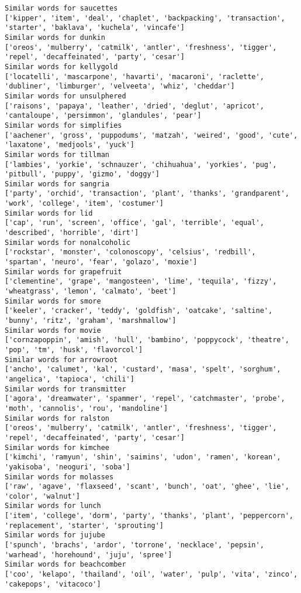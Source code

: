 \documentclass[11pt]{article}
\begin{document}
\begin{Verbatim}[commandchars=\\\{\}]
Similar words for saucettes
['kipper', 'item', 'deal', 'chaplet', 'backpacking', 'transaction', 'starter', 'baklava', 'kuchela', 'vincafe']
Similar words for dunkin
['oreos', 'mulberry', 'catmilk', 'antler', 'freshness', 'tigger', 'repel', 'decaffeinated', 'party', 'cesar']
Similar words for kellygold
['locatelli', 'mascarpone', 'havarti', 'macaroni', 'raclette', 'dubliner', 'limburger', 'velveeta', 'whiz', 'cheddar']
Similar words for unsulphered
['raisons', 'papaya', 'leather', 'dried', 'deglut', 'apricot', 'cantaloupe', 'persimmon', 'glandules', 'pear']
Similar words for simplifies
['aachener', 'gross', 'puppodums', 'matzah', 'weired', 'good', 'cute', 'laxatone', 'medjools', 'yuck']
Similar words for tillman
['lambies', 'yorkie', 'schnauzer', 'chihuahua', 'yorkies', 'pug', 'pitbull', 'puppy', 'gizmo', 'doggy']
Similar words for sangria
['party', 'orchid', 'transaction', 'plant', 'thanks', 'grandparent', 'work', 'college', 'item', 'costumer']
Similar words for lid
['cap', 'run', 'screen', 'office', 'gal', 'terrible', 'equal', 'described', 'horrible', 'dirt']
Similar words for nonalcoholic
['rockstar', 'monster', 'colonoscopy', 'celsius', 'redbill', 'spartan', 'neuro', 'fear', 'golazo', 'moxie']
Similar words for grapefruit
['clementine', 'grape', 'mangosteen', 'lime', 'tequila', 'fizzy', 'wheatgrass', 'lemon', 'calmato', 'beet']
Similar words for smore
['keeler', 'cracker', 'teddy', 'goldfish', 'oatcake', 'saltine', 'bunny', 'ritz', 'graham', 'marshmallow']
Similar words for movie
['cornzapoppin', 'amish', 'hull', 'bambino', 'poppycock', 'theatre', 'pop', 'tm', 'husk', 'flavorcol']
Similar words for arrowroot
['ancho', 'calumet', 'kal', 'custard', 'masa', 'spelt', 'sorghum', 'angelica', 'tapioca', 'chili']
Similar words for transmitter
['agora', 'dreamwater', 'spammer', 'repel', 'catchmaster', 'probe', 'moth', 'cannolis', 'rou', 'mandoline']
Similar words for ralston
['oreos', 'mulberry', 'catmilk', 'antler', 'freshness', 'tigger', 'repel', 'decaffeinated', 'party', 'cesar']
Similar words for kimchee
['kimchi', 'ramyun', 'shin', 'saimins', 'udon', 'ramen', 'korean', 'yakisoba', 'neoguri', 'soba']
Similar words for molasses
['raw', 'agave', 'flaxseed', 'scant', 'bunch', 'oat', 'ghee', 'lie', 'color', 'walnut']
Similar words for lunch
['item', 'college', 'dorm', 'party', 'thanks', 'plant', 'peppercorn', 'replacement', 'starter', 'sprouting']
Similar words for jujube
['spunch', 'brachs', 'ardor', 'torrone', 'necklace', 'pepsin', 'warhead', 'horehound', 'juju', 'spree']
Similar words for beachcomber
['coo', 'kelapo', 'thailand', 'oil', 'water', 'pulp', 'vita', 'zinco', 'cakepops', 'vitacoco']

\end{Verbatim}
\end{document}
